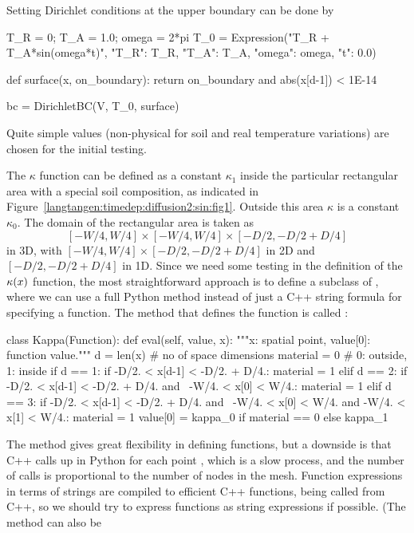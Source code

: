 Setting Dirichlet conditions at the upper boundary can be done by
\begin{python}
T_R = 0; T_A = 1.0; omega = 2*pi
T_0 = Expression("T_R + T_A*sin(omega*t)",
                 {"T_R": T_R, "T_A": T_A, "omega": omega, "t": 0.0})

def surface(x, on_boundary):
    return on_boundary and abs(x[d-1]) < 1E-14

bc = DirichletBC(V, T_0, surface)
\end{python}
Quite simple values (non-physical for soil and real temperature variations)
are chosen for the initial testing.

The $\kappa$ function can be defined as a constant $\kappa_1$ inside
the particular rectangular area with a special soil composition, as
indicated in Figure~\ref{langtangen:timedep:diffusion2:sin:fig1}. Outside
this area $\kappa$ is a constant $\kappa_0$.
The domain of the rectangular area is taken as
\[ [-W/4, W/4]\times [-W/4, W/4]\times [-D/2, -D/2 + D/4]\]
in 3D, with $[-W/4, W/4]\times [-D/2, -D/2 + D/4]$ in 2D and
$[-D/2, -D/2 + D/4]$ in 1D.
Since we need some testing in the definition of the $\kappa({x})$
function, the most straightforward approach is to define a subclass
of , where we can use a full Python method instead of
just a C++ string formula for specifying a function.
The method that defines the function is called :
\begin{python}
class Kappa(Function):
    def eval(self, value, x):
        """x: spatial point, value[0]: function value."""
        d = len(x)  # no of space dimensions
        material = 0  # 0: outside, 1: inside
        if d == 1:
            if -D/2. < x[d-1] < -D/2. + D/4.:
                material = 1
        elif d == 2:
            if -D/2. < x[d-1] < -D/2. + D/4. and \
               -W/4. < x[0] < W/4.:
                material = 1
        elif d == 3:
            if -D/2. < x[d-1] < -D/2. + D/4. and \
               -W/4. < x[0] < W/4. and -W/4. < x[1] < W/4.:
                material = 1
        value[0] = kappa_0 if material == 0 else kappa_1
\end{python}
The  method gives great flexibility in defining functions,
but a downside is that C++ calls up \emp{eval} in Python for
each point \emp{x}, which is a slow process, and the number of calls
is proportional to the number of nodes in the mesh.
Function expressions in terms of strings are compiled to efficient
C++ functions, being called from C++, so we should try to express functions
as string expressions if possible. (The \emp{eval} method can also be
